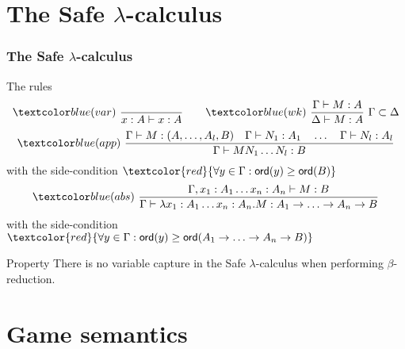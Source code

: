 \section{The Safe \texorpdfstring{$\lambda$}{lambda}-calculus}
\begin{frame} \frametitle{The Safe $\lambda$-calculus}
\begin{block}{The rules}
$$ \rulename{var} \   \rulef{}{x : A\vdash x : A}
\qquad  \rulename{wk} \   \rulef{\Gamma \vdash M : A}{\Delta \vdash M : A} \ \Gamma \subset \Delta$$
$$ \rulename{app} \  \rulef{\Gamma \vdash M : (A,\ldots,A_l,B)
                                        \quad \Gamma \vdash N_1 : A_1
                                        \quad \ldots \quad \Gamma \vdash N_l : A_l  }
                                   {\Gamma  \vdash M N_1 \ldots N_l : B}$$
\hfill with the side-condition $\textcolor{red}{\forall y \in \Gamma : \ord{y} \geq \ord{B}}$
$$ \rulename{abs} \   \rulef{\Gamma, x_1:A_1 \ldots x_n : A_n \vdash M : B}
                                   {\Gamma  \vdash \lambda x_1:A_1 \ldots x_n : A_n . M : A_1 \rightarrow \ldots \rightarrow A_n \rightarrow B}$$
\hfill with the side-condition $\textcolor{red}{\forall y \in \Gamma : \ord{y} \geq \ord{A_1 \rightarrow \ldots \rightarrow A_n \rightarrow B}}$
\end{block} 

\begin{block}{Property} 
There is no variable capture in the Safe $\lambda$-calculus when performing $\beta$-reduction.
\end{block} 
\end{frame}


\section{Game semantics}


\def\highlightat#1#2{\expandafter\alt<#1->{\textcolor{DarkGreen}{#2}}{#2}}
\def\visibleat#1#2{\expandafter\visible<#1->{#2}}

